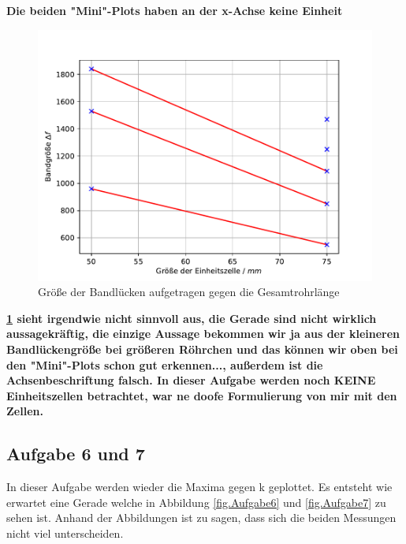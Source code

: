 \textbf{\huge{Die beiden "Mini"-Plots haben an der x-Achse keine Einheit}}

\begin{figure}[h!]
  \centering
  \includegraphics[width=\textwidth]{newtest.pdf}
  \caption{Größe der Bandlücken aufgetragen gegen die Gesamtrohrlänge}
  \label{fig.Aufgabe5a}
\end{figure}
\FloatBarrier

\textbf{\huge{\ref{fig.Aufgabe5a} sieht irgendwie nicht sinnvoll aus, die Gerade sind nicht wirklich aussagekräftig, die einzige Aussage bekommen wir ja aus der kleineren Bandlückengröße bei größeren Röhrchen und das können wir oben bei den "Mini"-Plots schon gut erkennen..., außerdem ist die Achsenbeschriftung falsch. In dieser Aufgabe werden noch KEINE Einheitszellen betrachtet, war ne doofe Formulierung von mir mit den Zellen. }}


\subsection{Aufgabe 6 und 7}
In dieser Aufgabe werden wieder die Maxima gegen k geplottet. Es entsteht wie erwartet eine Gerade welche in Abbildung \ref{fig.Aufgabe6} und \ref{fig.Aufgabe7} zu sehen ist.
Anhand der Abbildungen ist zu sagen, dass sich die beiden Messungen nicht viel unterscheiden.

